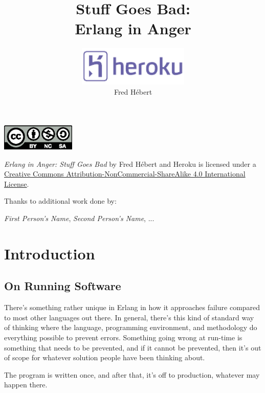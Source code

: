 \documentclass[11pt, oneside]{book}   	%
\title{Stuff Goes Bad:\protect\\ Erlang in Anger}
\author{\includegraphics[width=150pt]{heroku-logo-light.pdf}\\
Fred Hébert}
\date{}							%
\begin{document}
\maketitle

\clearpage
\thispagestyle{empty}
\vspace*{\fill}



\begin{center}
\includegraphics[width=100pt]{by-nc-sa.eps}
\end{center}

\begin{center}
\emph{Erlang in Anger: Stuff Goes Bad} by Fred Hébert and Heroku is licensed under a \href{http://creativecommons.org/licenses/by-nc-sa/4.0/}{Creative Commons Attribution-NonCommercial-ShareAlike 4.0 International License}.
\end{center}

Thanks to additional work done by:

\emph{First Person's Name}, \emph{Second Person's Name}, ...

\vspace*{\fill}
\clearpage


\tableofcontents

\listoffigures

\chapter{Introduction}
\label{chap:introduction}

\section{On Running Software}
\label{sec:on-running-software}

There's something rather unique in Erlang in how it approaches failure compared to most other languages out there. In general, there's this kind of standard way of thinking where the language, programming environment, and methodology do everything possible to prevent errors. Something going wrong at run-time is something that needs to be prevented, and if it cannot be prevented, then it's out of scope for whatever solution people have been thinking about.

The program is written once, and after that, it's off to production, whatever may happen there.
\end{document}
